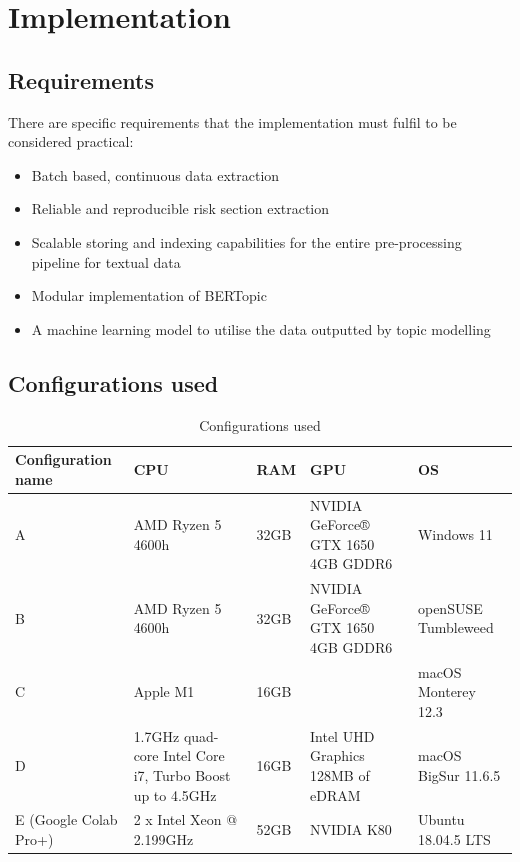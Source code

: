 \documentclass[12pt,MSc,a4paper,oneside]{muthesis}
\begin{document}
\chapter{Implementation}

\section{Requirements}
There are specific requirements that the implementation must fulfil to be considered practical:
\begin{itemize}
  \item Batch based, continuous data extraction
  \item Reliable and reproducible risk section extraction
  \item Scalable storing and indexing capabilities for the entire pre-processing pipeline for textual data
  \item Modular implementation of BERTopic
  \item A machine learning model to utilise the data outputted by topic modelling
\end{itemize}
\newpage

\section{Configurations used}

\begin{table}[h]
  \caption{Configurations used}
  \label{tab:freq}
  \begin{tabularx}{\textwidth}{|X|X|X|X|X|}
    \toprule
    {Configuration name}&{CPU}&{RAM}&{GPU}&{OS}\\
    \midrule
    A & AMD Ryzen 5 4600h & 32GB & NVIDIA GeForce® GTX 1650 4GB GDDR6 & Windows 11\\ \hline
    B & AMD Ryzen 5 4600h & 32GB & NVIDIA GeForce® GTX 1650 4GB GDDR6 & openSUSE Tumbleweed\\ \hline
    C & Apple M1 & 16GB &  & macOS Monterey 12.3\\ \hline
    D & 1.7GHz quad-core Intel Core i7, Turbo Boost up to 4.5GHz & 16GB & Intel UHD Graphics 128MB of eDRAM & macOS BigSur 11.6.5\\ \hline
    E (Google Colab Pro+) & 2 x Intel Xeon @ 2.199GHz & 52GB & NVIDIA K80 & Ubuntu 18.04.5 LTS\\
    \bottomrule
  \end{tabularx}
\end{table}
\end{document}
